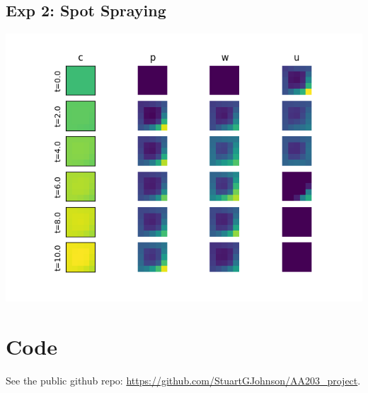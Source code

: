 \documentclass[11pt]{article}
\begin{document}
\subsection{Exp 2: Spot Spraying}

\begin{minipage}{\textwidth}
	\begin{center}
		\includegraphics[width=0.8\linewidth]{../scp_240604-085334/slices.png}
		\vspace{5pt}
	\end{center}
\end{minipage}

\section{Code}

See the public github repo: \href{https://github.com/StuartGJohnson/AA203\_project}{https://github.com/StuartGJohnson/AA203\_project}.
\end{document}
